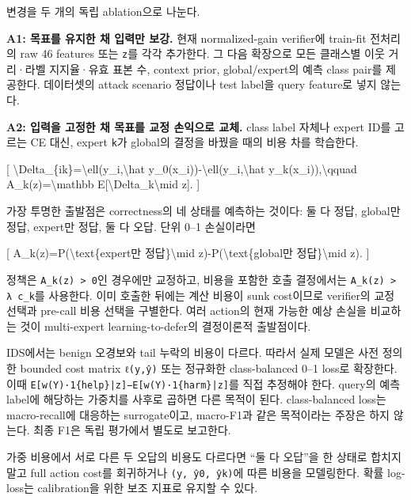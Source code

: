 변경을 두 개의 독립 ablation으로 나눈다.

\textbf{A1: 목표를 유지한 채 입력만 보강.} 현재 normalized-gain verifier에 train-fit 전처리의 raw 46 features 또는 \texttt{z}를 각각 추가한다. 그 다음 확장으로 모든 클래스별 이웃 거리·라벨 지지율·유효 표본 수, context prior, global/\allowbreak{}expert의 예측 class pair를 제공한다. 데이터셋의 attack scenario 정답이나 test label을 query feature로 넣지 않는다.

\textbf{A2: 입력을 고정한 채 목표를 교정 손익으로 교체.} class label 자체나 expert ID를 고르는 CE 대신, expert \texttt{k}가 global의 결정을 바꿨을 때의 비용 차를 학습한다.

[ \textbackslash{}Delta\_\allowbreak{}\{ik\}=\allowbreak{}\textbackslash{}ell(y\_\allowbreak{}i,\textbackslash{}hat y\_\allowbreak{}0(x\_\allowbreak{}i))-\textbackslash{}ell(y\_\allowbreak{}i,\textbackslash{}hat y\_\allowbreak{}k(x\_\allowbreak{}i)),\textbackslash{}qquad A\_\allowbreak{}k(z)=\allowbreak{}\textbackslash{}mathbb E[\textbackslash{}Delta\_\allowbreak{}k\textbackslash{}mid z]. ]

가장 투명한 출발점은 correctness의 네 상태를 예측하는 것이다: 둘 다 정답, global만 정답, expert만 정답, 둘 다 오답. 단위 0–1 손실이라면

[ A\_\allowbreak{}k(z)=\allowbreak{}P(\textbackslash{}text\{expert만 정답\}\textbackslash{}mid z)-P(\textbackslash{}text\{global만 정답\}\textbackslash{}mid z). ]

정책은 \texttt{A\_\allowbreak{}\allowbreak{}k(z) >\allowbreak{} 0}인 경우에만 교정하고, 비용을 포함한 호출 결정에서는 \texttt{A\_\allowbreak{}\allowbreak{}k(z) >\allowbreak{} λ c\_\allowbreak{}\allowbreak{}k}를 사용한다. 이미 호출한 뒤에는 계산 비용이 sunk cost이므로 verifier의 교정 선택과 pre-call 비용 선택을 구별한다. 여러 action의 현재 가능한 예상 손실을 비교하는 것이 multi-expert learning-to-defer의 결정이론적 출발점이다.

IDS에서는 benign 오경보와 tail 누락의 비용이 다르다. 따라서 실제 모델은 사전 정의한 bounded cost matrix \texttt{ℓ(y,\allowbreak{}ŷ)} 또는 정규화한 class-balanced 0–1 loss로 확장한다. 이때 \texttt{E[w(Y)·1\allowbreak{}\{\allowbreak{}help\}\allowbreak{}|z\allowbreak{}]−E[w(Y)\allowbreak{}·1\{\allowbreak{}harm\}\allowbreak{}|z]}를 직접 추정해야 한다. query의 예측 label에 해당하는 가중치를 사후로 곱하면 다른 목적이 된다. class-balanced loss는 macro-recall에 대응하는 surrogate이고, macro-F1과 같은 목적이라는 주장은 하지 않는다. 최종 F1은 독립 평가에서 별도로 보고한다.

가중 비용에서 서로 다른 두 오답의 비용도 다르다면 “둘 다 오답”을 한 상태로 합치지 말고 full action cost를 회귀하거나 \texttt{(y,\allowbreak{} ŷ0,\allowbreak{} \allowbreak{}ŷk)}에 따른 비용을 모델링한다. 확률 log-loss는 calibration을 위한 보조 지표로 유지할 수 있다.

